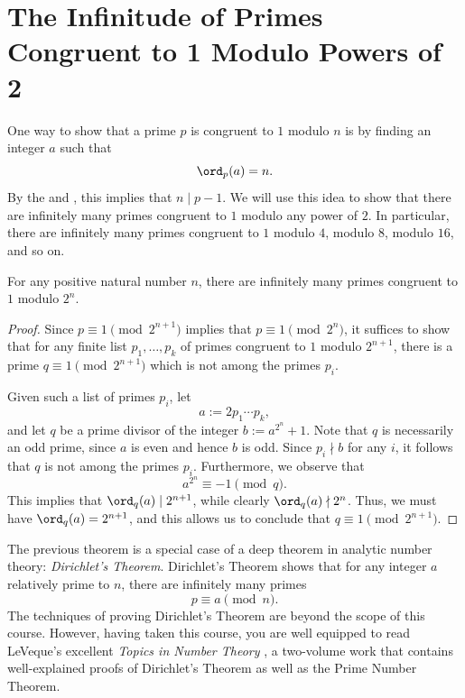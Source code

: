 \section{The Infinitude of Primes Congruent to 1 Modulo Powers of 2}

One way to show that a prime $p$ is congruent to $1$ modulo $n$ is by finding an integer $a$ such that
\begin{equation*}
  \ord_p(a)=n.
\end{equation*}
By the  and , this implies that $n\mid p-1$. We will use this idea to show that there are infinitely many primes congruent to $1$ modulo any power of $2$. In particular, there are infinitely many primes congruent to $1$ modulo $4$, modulo $8$, modulo $16$, and so on.

\begin{theorem}\label{theorem:infinitude-of-primes-1-mod-power-of-2}
  For any positive natural number $n$, there are infinitely many primes congruent to $1$ modulo $2^n$.
\end{theorem}

\begin{proof}
  Since $p\equiv 1\pmod{2^{n+1}}$ implies that $p\equiv 1\pmod{2^n}$, it suffices to show that for any finite list $p_1,\ldots,p_k$ of primes congruent to $1$ modulo $2^{n+1}$, there is a prime $q\equiv 1\pmod{2^{n+1}}$ which is not among the primes $p_i$.

  Given such a list of primes $p_i$, let
  \begin{equation*}
    a:=2p_1\cdots p_k,
  \end{equation*}
  and let $q$ be a prime divisor of the integer $b:=a^{2^n}+1$. Note that $q$ is necessarily an odd prime, since $a$ is even and hence $b$ is odd. Since $p_i\nmid b$ for any $i$, it follows that $q$ is not among the primes $p_i$. Furthermore, we observe that
  \begin{equation*}
    a^{2^n}\equiv -1\pmod{q}.
  \end{equation*}
  This implies that $\ord_q(a)\mid 2^{n+1}$, while clearly $\ord_q(a)\nmid 2^n$. Thus, we must have $\ord_q(a)=2^{n+1}$, and this allows us to conclude that $q\equiv 1\pmod{2^{n+1}}$.
\end{proof}

The previous theorem is a special case of a deep theorem in analytic number theory: \emph{Dirichlet's Theorem}. Dirichlet's Theorem shows that for any integer $a$ relatively prime to $n$, there are infinitely many primes
\begin{equation*}
  p\equiv a\pmod{n}.
\end{equation*}
The techniques of proving Dirichlet's Theorem are beyond the scope of this course. However, having taken this course, you are well equipped to read LeVeque's excellent \emph{Topics in Number Theory} \cite{leveque1956vol1,leveque1956vol2}, a two-volume work that contains well-explained proofs of Dirichlet's Theorem as well as the Prime Number Theorem.

